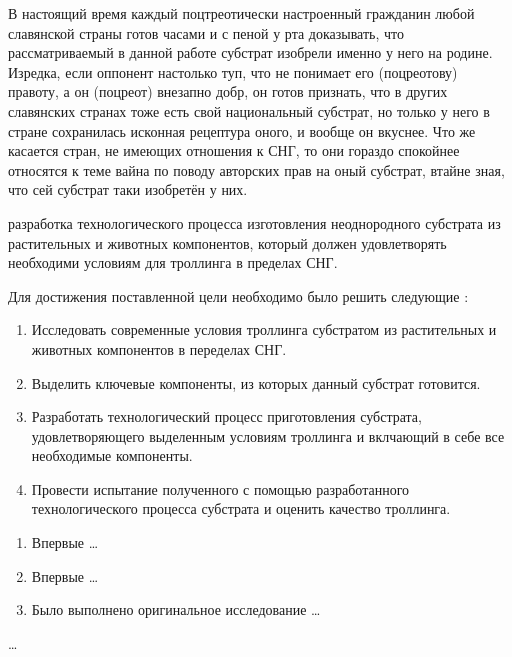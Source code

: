 
{\actuality} В настоящий время каждый поцтреотически настроенный гражданин любой славянской страны готов часами и с пеной у рта доказывать, что рассматриваемый в данной работе субстрат изобрели именно у него на родине. Изредка, если оппонент настолько туп, что не понимает его (поцреотову) правоту, а он (поцреот) внезапно добр, он готов признать, что в других славянских странах тоже есть свой национальный субстрат, но только у него в стране сохранилась исконная рецептура оного, и вообще он вкуснее.
Что же касается стран, не имеющих отношения к СНГ, то они гораздо спокойнее относятся к теме вайна по поводу авторских прав на оный субстрат, втайне зная, что сей субстрат таки изобретён у них.

{\aim} разработка технологического процесса изготовления неоднородного субстрата из растительных и животных компонентов, который должен удовлетворять необходими условиям для троллинга в пределах СНГ.

Для достижения поставленной цели необходимо было решить следующие {\tasks}:

\begin{enumerate}
  \item Исследовать современные условия троллинга субстратом из растительных и животных компонентов в переделах СНГ.
  \item Выделить ключевые компоненты, из которых данный субстрат готовится.
  \item Разработать технологический процесс приготовления субстрата, удовлетворяющего выделенным условиям троллинга и вклчающий в себе все необходимые компоненты.
  \item Провести испытание полученного с помощью разработанного технологического процесса субстрата и оценить качество троллинга.
\end{enumerate}


{\novelty}
\begin{enumerate}
  \item Впервые \ldots
  \item Впервые \ldots
  \item Было выполнено оригинальное исследование \ldots
\end{enumerate}

{\influence} \ldots

